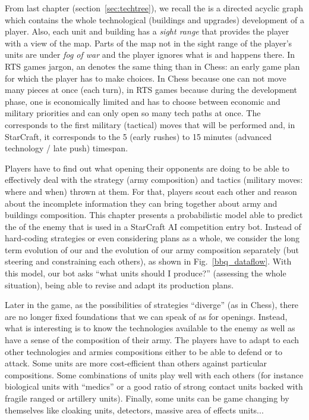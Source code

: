 From last chapter (section~\ref{sec:techtree}), we recall the \textit{} is a directed acyclic graph which contains the whole technological (buildings and upgrades) development of a player. Also, each unit and building has a \textit{sight range} that provides the player with a view of the map. Parts of the map not in the sight range of the player's units are under \textit{fog of war} and the player ignores what is and happens there. In RTS games jargon, an \textit{} denotes the same thing than in Chess: an early game plan for which the player has to make choices. In Chess because one can not move many pieces at once (each turn), in RTS games because during the development phase, one is economically limited and has to choose between economic and military priorities and can only open so many tech paths at once. The  corresponds to the first military (tactical) moves that will be performed and, in StarCraft, it corresponds to the 5 (early rushes) to 15 minutes (advanced technology / late push) timespan. 


Players have to find out what opening their opponents are doing to be able to effectively deal with the strategy (army composition) and tactics (military moves: where and when) thrown at them. For that, players scout each other and reason about the incomplete information they can bring together about army and buildings composition. This chapter presents a probabilistic model able to predict the \textit{} of the enemy that is used in a StarCraft AI competition entry bot. Instead of hard-coding strategies or even considering plans as a whole, we consider the long term evolution of our  and the evolution of our army composition separately (but steering and constraining each others), as shown in Fig.~\ref{bbq_dataflow}. With this model, our bot asks ``what units should I produce?'' (assessing the whole situation), being able to revise and adapt its production plans.

Later in the game, as the possibilities of strategies ``diverge'' (as in Chess), there are no longer fixed foundations that we can speak of as for openings. Instead, what is interesting is to know the technologies available to the enemy as well as have a sense of the composition of their army. The players have to adapt to each other technologies and armies compositions either to be able to defend or to attack. Some units are more cost-efficient than others against particular compositions. Some combinations of units play well with each others (for instance biological units with ``medics'' or a good ratio of strong contact units backed with fragile ranged or artillery units). Finally, some units can be game changing by themselves like cloaking units, detectors, massive area of effects units... 


